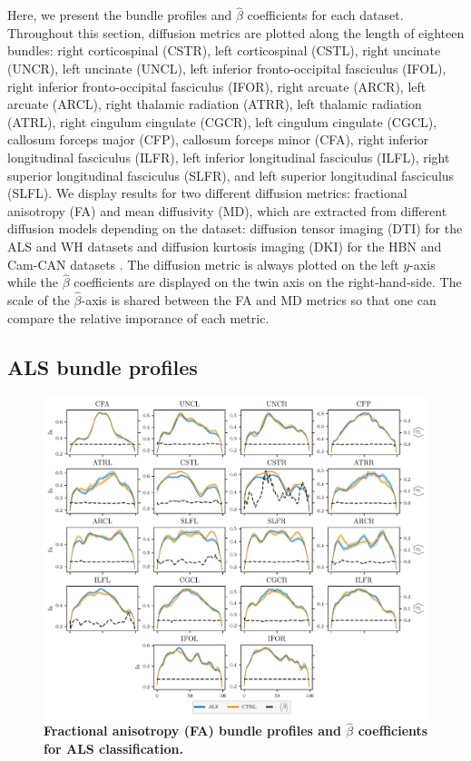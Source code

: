 \documentclass[10pt,%
               aps,%
               prl,%
               preprint,%
               superscriptaddress,%
               preprintnumbers,%
               amsmath,%
               floatfix,%
               endfloats*]{revtex4-2}
\begin{document}
Here, we present the bundle profiles and $\hat{\beta}$ coefficients
for each dataset. Throughout this section, diffusion metrics are plotted
along the length of eighteen bundles:
right corticospinal (CSTR),
left corticospinal (CSTL),
right uncinate (UNCR),
left uncinate (UNCL),
left inferior fronto-occipital fasciculus (IFOL),
right inferior fronto-occipital fasciculus (IFOR),
right arcuate (ARCR),
left arcuate (ARCL),
right thalamic radiation (ATRR),
left thalamic radiation (ATRL),
right cingulum cingulate (CGCR),
left cingulum cingulate (CGCL),
callosum forceps major (CFP),
callosum forceps minor (CFA),
right inferior longitudinal fasciculus (ILFR),
left inferior longitudinal fasciculus (ILFL),
right superior longitudinal fasciculus (SLFR),
and left superior longitudinal fasciculus (SLFL).
We display results for two different diffusion metrics: fractional anisotropy
(FA) and mean diffusivity (MD), which are extracted from different diffusion
models depending on the dataset: diffusion tensor imaging (DTI) for the ALS
and WH datasets and diffusion kurtosis imaging (DKI) for the HBN and Cam-CAN
datasets \cite{jensen2005diffusion}. The diffusion metric is always plotted
on the left $y$-axis while the $\hat{\beta}$ coefficients are displayed on
the twin axis on the right-hand-side. The scale of the $\hat{\beta}$-axis is
shared between the FA and MD metrics so that one can compare the relative
imporance of each metric.

\subsection{ALS bundle profiles}

\begin{figure}
    \includegraphics[width=\textwidth]{sarica_coefs_profiles_fa.pdf}
    \caption{%
        {%
            \bf Fractional anisotropy (FA) bundle profiles and $\hat{\beta}$
            coefficients for ALS classification.
        }
        \label{fig:als-bp:fa}
    }
\end{figure}
\end{document}
